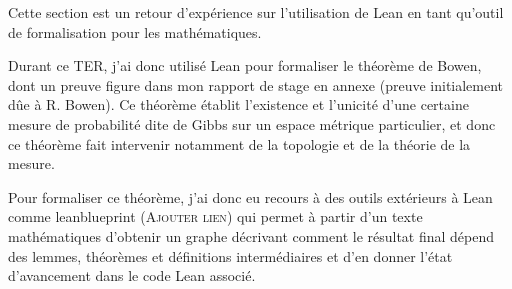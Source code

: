 \documentclass[../../rapport.tex]{subfiles}
\begin{document}
  Cette section est un retour d'expérience sur l'utilisation de Lean en tant qu'outil de formalisation pour les
  mathématiques.

  Durant ce TER, j'ai donc utilisé Lean pour formaliser le théorème de Bowen, dont un preuve figure dans mon rapport de stage
  en annexe (preuve initialement dûe à R. Bowen).
  Ce théorème établit l'existence et l'unicité d'une certaine mesure de probabilité dite de Gibbs sur un espace métrique particulier,
  et donc ce théorème fait intervenir notamment de la topologie et de la théorie de la mesure.

  Pour formaliser ce théorème, j'ai donc eu recours à des outils extérieurs à Lean comme
  leanblueprint (\textsc{Ajouter lien})
  qui permet à partir d'un texte mathématiques d'obtenir un graphe décrivant comment le résultat final dépend
  des lemmes, théorèmes et définitions intermédiaires et d'en donner l'état d'avancement dans le code Lean associé.
\end{document}
